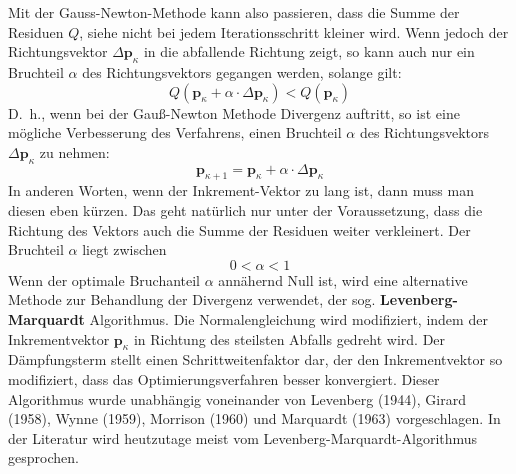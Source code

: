 Mit der Gauss-Newton-Methode kann also passieren, dass die Summe der Residuen $Q$, siehe  nicht bei jedem Iterationsschritt kleiner
wird. Wenn jedoch der Richtungsvektor $\Delta \mathbf{p}_{\kappa}$ in die abfallende Richtung
zeigt, so kann auch nur ein Bruchteil $\alpha$ des Richtungsvektors gegangen
werden, solange gilt:
\begin{equation}
Q(\mathbf{p}_{\kappa} + \alpha \cdot \Delta \mathbf{p}_{\kappa}) < Q(\mathbf{p}_{\kappa})
\end{equation}
D.~h., wenn bei der Gauß-Newton Methode Divergenz auftritt, so ist eine
mögliche Verbesserung des Verfahrens, einen Bruchteil $\alpha$ des Richtungsvektors $\Delta\mathbf{p}_{\kappa}$ zu nehmen:
\begin{equation}
\mathbf{p}_{\kappa+1}= \mathbf{p}_{\kappa} + \alpha \cdot \Delta\mathbf{p}_{\kappa}
\end{equation}
In anderen Worten, wenn der Inkrement-Vektor zu lang ist, dann muss man diesen
eben kürzen. Das geht natürlich nur unter der Voraussetzung, dass die Richtung
des Vektors auch die Summe der Residuen weiter verkleinert. Der Bruchteil $\alpha$
liegt zwischen
\[
0 < \alpha < 1
\]
Wenn der optimale Bruchanteil $\alpha$ annähernd Null ist, wird eine alternative Methode zur Behandlung der Divergenz verwendet, der sog. \textbf{Levenberg-Marquardt}
Algorithmus.
Die Normalengleichung wird modifiziert, indem der Inkrementvektor $\mathbf{p}_{\kappa}$ in Richtung des steilsten Abfalls gedreht wird. Der Dämpfungsterm stellt einen Schrittweitenfaktor dar, der den Inkrementvektor
so modifiziert, dass das Optimierungsverfahren besser konvergiert. Dieser
Algorithmus wurde unabhängig voneinander von Levenberg (1944), Girard (1958), Wynne (1959),
Morrison (1960) und Marquardt (1963) vorgeschlagen. In der Literatur wird heutzutage meist vom
Levenberg-Marquardt-Algorithmus gesprochen.

